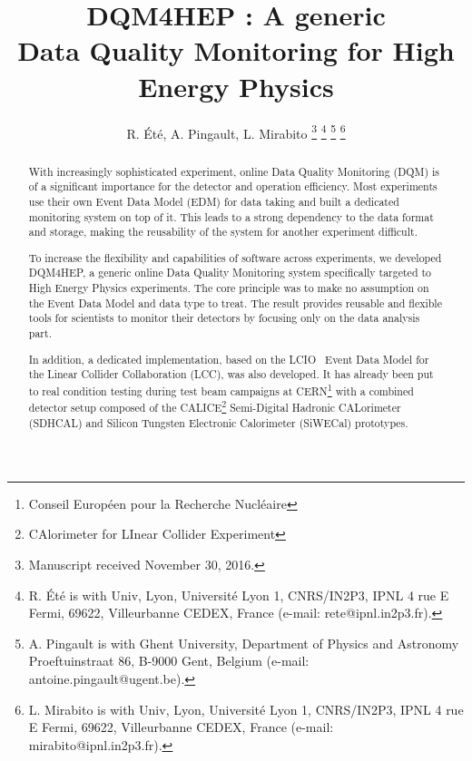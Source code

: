 \documentclass[journal]{IEEEtran}
\begin{document}
\title{DQM4HEP : A generic\\Data Quality Monitoring for High Energy Physics}
%
%

\author{R. \'Et\'e, A. Pingault, L. Mirabito
\thanks{Manuscript received November 30, 2016.}%
\thanks{R. \'Et\'e is with Univ, Lyon, Universit\'e Lyon 1, CNRS/IN2P3, IPNL 4 rue E Fermi, 69622, Villeurbanne CEDEX, France (e-mail: rete@ipnl.in2p3.fr).}%
\thanks{A. Pingault is with Ghent University, Department of Physics and Astronomy Proeftuinstraat 86, B-9000 Gent, Belgium (e-mail: antoine.pingault@ugent.be).}%
\thanks{L. Mirabito is with Univ, Lyon, Universit\'e Lyon 1, CNRS/IN2P3, IPNL 4 rue E Fermi, 69622, Villeurbanne CEDEX, France (e-mail: mirabito@ipnl.in2p3.fr).}%
}

\maketitle
\pagestyle{empty}
\thispagestyle{empty}

\begin{abstract}
With increasingly sophisticated experiment, online Data Quality Monitoring (DQM) is of a significant importance for the detector and operation efficiency. Most experiments use their own Event Data Model (EDM) for data taking and built a dedicated monitoring system on top of it. This leads to a strong dependency to the data format and storage, making the reusability of the system for another experiment difficult.

To increase the flexibility and capabilities of software across experiments, we developed DQM4HEP, a generic online Data Quality Monitoring system specifically targeted to High Energy Physics experiments. The core principle was to make no assumption on the Event Data Model and data type to treat. The result provides reusable and flexible tools for scientists to monitor their detectors by focusing only on the data analysis part.

In addition, a dedicated implementation, based on the LCIO~\cite{LCIO} Event Data Model for the Linear Collider Collaboration (LCC), was also developed. It has already been put to real condition testing during test beam campaigns at CERN\footnote{Conseil Européen pour la Recherche Nucléaire} with a combined detector setup composed of the CALICE\footnote{CAlorimeter for LInear Collider Experiment} Semi-Digital Hadronic CALorimeter (SDHCAL) and Silicon Tungsten Electronic Calorimeter (SiWECal) prototypes.
\end{abstract}
\end{document}
